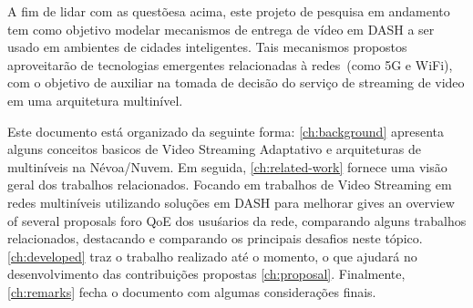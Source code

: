 




A fim de lidar com as questõesa acima, este projeto de pesquisa em andamento tem como objetivo modelar mecanismos de entrega de vídeo em DASH %
a ser usado em ambientes de cidades inteligentes. Tais mecanismos propostos aproveitarão de tecnologias emergentes relacionadas à redes~(como 5G e WiFi), com o objetivo de auxiliar na tomada de decisão do serviço de streaming de video em uma arquitetura multinível. %

Este documento está organizado da seguinte forma: \autoref{ch:background} apresenta
alguns conceitos basicos de Video Streaming Adaptativo e arquiteturas de multiníveis na Névoa/Nuvem. Em seguida, \autoref{ch:related-work} fornece uma visão geral dos trabalhos relacionados. Focando em trabalhos de Video Streaming em redes multiníveis utilizando soluções em DASH para melhorar gives an overview of several proposals foro QoE dos usuśarios da rede, comparando alguns trabalhos relacionados, destacando e comparando os principais desafios neste tópico. \autoref{ch:developed} traz o trabalho realizado até o momento, o que ajudará no desenvolvimento das contribuições propostas \autoref{ch:proposal}. Finalmente, \autoref{ch:remarks} fecha o documento com algumas considerações finais.
 
